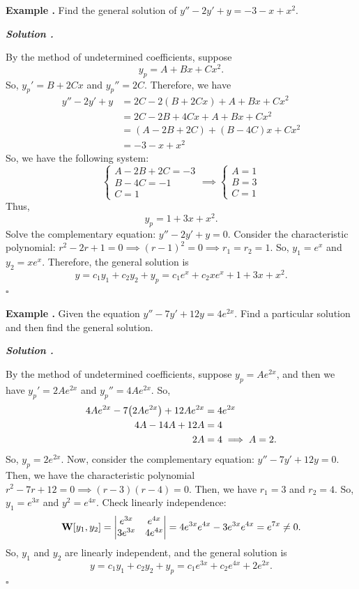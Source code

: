 \documentclass[12pt, a4paper]{article}
\newcounter{index}[subsection]
\newenvironment*{eg}{\begin{framed}\par\noindent\textbf{Example \thesubsection.\stepcounter{index}\theindex}}{\par\end{framed}}
\newcounter{nprf}[subsection]
\newenvironment*{sol}{\par\indent\textbf{\textit{Solution \stepcounter{nprf}\thenprf.}}\par}{\hfill{$\square$}\par}
\def\C{{\mathbb{C}}}
\def\W{\vb W}
\begin{document}
\begin{eg}
	Find the general solution of $y''-2y'+y=-3-x+x^2$. 
	\begin{sol}
		By the method of undetermined coefficients, suppose \[y_p=A+Bx+Cx^2.\] So, $y_p'=B+2Cx$ and $y_p''=2C$. Therefore, we have \begin{align*}y''-2y'+y&=2C-2(B+2Cx)+A+Bx+Cx^2\\&=2C-2B+4Cx+A+Bx+Cx^2\\&=(A-2B+2C)+(B-4C)x+Cx^2\\&=-3-x+x^2\end{align*} So, we have the following system: \[\begin{cases}A-2B+2C=-3\\B-4C=-1\\C=1\end{cases}\implies\begin{cases}A=1\\B=3\\C=1\end{cases}\] Thus, \[y_p=1+3x+x^2.\] Solve the complementary equation: $y''-2y'+y=0$. Consider the characteristic polynomial: $r^2-2r+1=0\implies(r-1)^2=0\implies r_1=r_2=1$. So, $y_1=e^x$ and $y_2=xe^x$. Therefore, the general solution is \[y=c_1y_1+c_2y_2+y_p=c_1e^x+c_2xe^x+1+3x+x^2.\]
	\end{sol}
\end{eg}
\begin{eg}
	Given the equation $y''-7y'+12y=4e^{2x}$. Find a particular solution and then find the general solution. 
	\begin{sol}
		By the method of undetermined coefficients, suppose $y_p=Ae^{2x}$, and then we have $y_p'=2Ae^{2x}$ and $y_p''=4Ae^{2x}$. So, \begin{align*}4Ae^{2x}-7\qty(2Ae^{2x})+12Ae^{2x}&=4e^{2x}\\4A-14A+12A&=4\\2A&=4\implies A=2.\end{align*} So, $y_p=2e^{2x}$. Now, consider the complementary equation: $y''-7y'+12y=0$. Then, we have the characteristic polynomial $r^2-7r+12=0\implies(r-3)(r-4)=0$. Then, we have $r_1=3$ and $r_2=4$. So, $y_1=e^{3x}$ and $y^2=e^{4x}$. Check linearly independence: \[\W\qty[y_1,y_2]=\mqty|e^{3x}&e^{4x}\\3e^{3x}&4e^{4x}|=4e^{3x}e^{4x}-3e^{3x}e^{4x}=e^{7x}\neq0.\] So, $y_1$ and $y_2$ are linearly independent, and the general solution is \[y=c_1y_1+c_2y_2+y_p=c_1e^{3x}+c_2e^{4x}+2e^{2x}.\]
	\end{sol}
\end{eg}
\end{document}
